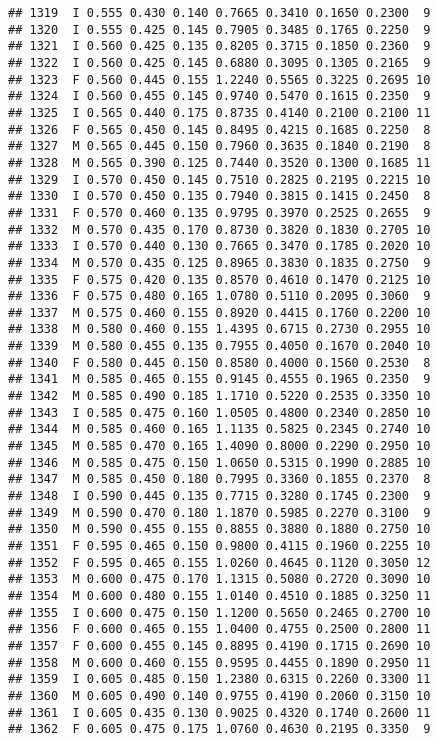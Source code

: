 \documentclass[
]{article}
\begin{document}
\begin{verbatim}
## 1319  I 0.555 0.430 0.140 0.7665 0.3410 0.1650 0.2300  9
## 1320  I 0.555 0.425 0.145 0.7905 0.3485 0.1765 0.2250  9
## 1321  I 0.560 0.425 0.135 0.8205 0.3715 0.1850 0.2360  9
## 1322  I 0.560 0.425 0.145 0.6880 0.3095 0.1305 0.2165  9
## 1323  F 0.560 0.445 0.155 1.2240 0.5565 0.3225 0.2695 10
## 1324  I 0.560 0.455 0.145 0.9740 0.5470 0.1615 0.2350  9
## 1325  I 0.565 0.440 0.175 0.8735 0.4140 0.2100 0.2100 11
## 1326  F 0.565 0.450 0.145 0.8495 0.4215 0.1685 0.2250  8
## 1327  M 0.565 0.445 0.150 0.7960 0.3635 0.1840 0.2190  8
## 1328  M 0.565 0.390 0.125 0.7440 0.3520 0.1300 0.1685 11
## 1329  I 0.570 0.450 0.145 0.7510 0.2825 0.2195 0.2215 10
## 1330  I 0.570 0.450 0.135 0.7940 0.3815 0.1415 0.2450  8
## 1331  F 0.570 0.460 0.135 0.9795 0.3970 0.2525 0.2655  9
## 1332  M 0.570 0.435 0.170 0.8730 0.3820 0.1830 0.2705 10
## 1333  I 0.570 0.440 0.130 0.7665 0.3470 0.1785 0.2020 10
## 1334  M 0.570 0.435 0.125 0.8965 0.3830 0.1835 0.2750  9
## 1335  F 0.575 0.420 0.135 0.8570 0.4610 0.1470 0.2125 10
## 1336  F 0.575 0.480 0.165 1.0780 0.5110 0.2095 0.3060  9
## 1337  M 0.575 0.460 0.155 0.8920 0.4415 0.1760 0.2200 10
## 1338  M 0.580 0.460 0.155 1.4395 0.6715 0.2730 0.2955 10
## 1339  M 0.580 0.455 0.135 0.7955 0.4050 0.1670 0.2040 10
## 1340  F 0.580 0.445 0.150 0.8580 0.4000 0.1560 0.2530  8
## 1341  M 0.585 0.465 0.155 0.9145 0.4555 0.1965 0.2350  9
## 1342  M 0.585 0.490 0.185 1.1710 0.5220 0.2535 0.3350 10
## 1343  I 0.585 0.475 0.160 1.0505 0.4800 0.2340 0.2850 10
## 1344  M 0.585 0.460 0.165 1.1135 0.5825 0.2345 0.2740 10
## 1345  M 0.585 0.470 0.165 1.4090 0.8000 0.2290 0.2950 10
## 1346  M 0.585 0.475 0.150 1.0650 0.5315 0.1990 0.2885 10
## 1347  M 0.585 0.450 0.180 0.7995 0.3360 0.1855 0.2370  8
## 1348  I 0.590 0.445 0.135 0.7715 0.3280 0.1745 0.2300  9
## 1349  M 0.590 0.470 0.180 1.1870 0.5985 0.2270 0.3100  9
## 1350  M 0.590 0.455 0.155 0.8855 0.3880 0.1880 0.2750 10
## 1351  F 0.595 0.465 0.150 0.9800 0.4115 0.1960 0.2255 10
## 1352  F 0.595 0.465 0.155 1.0260 0.4645 0.1120 0.3050 12
## 1353  M 0.600 0.475 0.170 1.1315 0.5080 0.2720 0.3090 10
## 1354  M 0.600 0.480 0.155 1.0140 0.4510 0.1885 0.3250 11
## 1355  I 0.600 0.475 0.150 1.1200 0.5650 0.2465 0.2700 10
## 1356  F 0.600 0.465 0.155 1.0400 0.4755 0.2500 0.2800 11
## 1357  F 0.600 0.455 0.145 0.8895 0.4190 0.1715 0.2690 10
## 1358  M 0.600 0.460 0.155 0.9595 0.4455 0.1890 0.2950 11
## 1359  I 0.605 0.485 0.150 1.2380 0.6315 0.2260 0.3300 11
## 1360  M 0.605 0.490 0.140 0.9755 0.4190 0.2060 0.3150 10
## 1361  I 0.605 0.435 0.130 0.9025 0.4320 0.1740 0.2600 11
## 1362  F 0.605 0.475 0.175 1.0760 0.4630 0.2195 0.3350  9

\end{verbatim}
\end{document}

